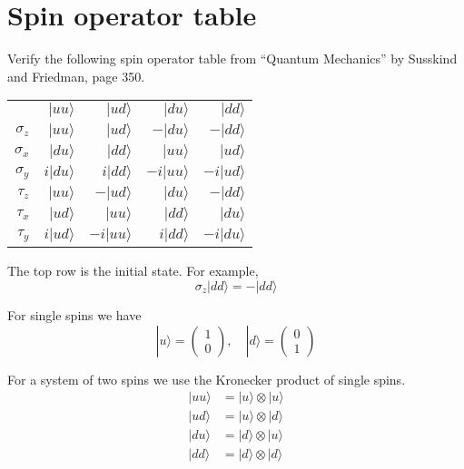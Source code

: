 

\section*{Spin operator table}

Verify the following spin operator table from ``Quantum Mechanics'' by Susskind and Friedman, page 350.

\begin{center}
\begin{tabular}{rrrrr}
& $|uu\rangle$ & $|ud\rangle$ & $|du\rangle$ & $|dd\rangle$
\\[1ex]
$\sigma_z$ & $|uu\rangle$ & $|ud\rangle$ & $-|du\rangle$ & $-|dd\rangle$
\\
$\sigma_x$ & $|du\rangle$ & $|dd\rangle$ & $|uu\rangle$ & $|ud\rangle$
\\
$\sigma_y$ & $i|du\rangle$ & $i|dd\rangle$ & $-i|uu\rangle$ & $-i|ud\rangle$
\\
$\tau_z$ & $|uu\rangle$ & $-|ud\rangle$ & $|du\rangle$ & $-|dd\rangle$
\\
$\tau_x$ & $|ud\rangle$ & $|uu\rangle$ & $|dd\rangle$ & $|du\rangle$
\\
$\tau_y$ & $i|ud\rangle$ & $-i|uu\rangle$ & $i|dd\rangle$ & $-i|du\rangle$
\end{tabular}
\end{center}

The top row is the initial state.
For example,
\begin{equation*}
\sigma_z|dd\rangle=-|dd\rangle
\end{equation*}

For single spins we have
\begin{equation*}
|u\rangle=\begin{pmatrix}1\\0\end{pmatrix},
\quad
|d\rangle=\begin{pmatrix}0\\1\end{pmatrix}
\end{equation*}

For a system of two spins we use the Kronecker product of single spins.
\begin{align*}
|uu\rangle&=|u\rangle\otimes|u\rangle
\\
|ud\rangle&=|u\rangle\otimes|d\rangle
\\
|du\rangle&=|d\rangle\otimes|u\rangle
\\
|dd\rangle&=|d\rangle\otimes|d\rangle
\end{align*}

